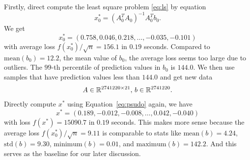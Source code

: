 Firstly, direct compute the least square problem \eqref{eq:ls}
by equation
\begin{equation} \label{eq:psudo}
    x_0^*=(A_0^TA_0)^{-1}A_0^Tb_0.
\end{equation}
We get
$$
    x_0^*=(0.758, 0.046, 0.218, \dots, -0.035, -0.101)
$$
with average loss $f(x_0^*)/\sqrt{n} = 156.1$ in $0.19$ seconds.
Compared to $\text{mean}(b_0)=12.2$, the mean value of $b_0$,
the average loss seems too large due to outliers.
The $99$-th percentile of prediction values in $b_0$ is $144.0$.
We then use samples that have prediction values less than $144.0$
and get new data
\begin{equation} \label{eq:data}
    A \in {\mathbb{R}}^{2741220\times 21}, \,
    b\in{\mathbb{R}}^{2741220}.
\end{equation}
Directly compute $x^*$ using Equation~\eqref{eq:psudo} again, we have
$$
    x^*=(0.189, -0.012, -0.008, \dots, 0.042, -0.040)
$$
with loss $f(x^*) = 15090.7$ in $0.19$ seconds.
This makes more sense because
the average loss
$f(x_0^*)/\sqrt{n} = 9.11$
is comparable to stats like
$\text{mean}(b)=4.24$,
$\text{std}(b) = 9.30$,
$\text{minimum}(b) = 0.01$, and
$\text{maximum}(b) = 142.2$.
And this serves as the baseline for our later discussion.

